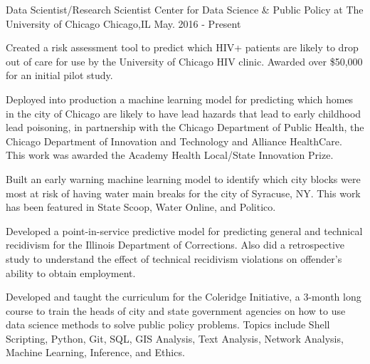 

\begin{cventries}


  \cventry
    {Data Scientist/Research Scientist} %
    {Center for Data Science \& Public Policy at The University of Chicago} %
    {Chicago,IL} %
    {May. 2016 - Present} %
    {\begin{cvitems}
        \setlength\itemsep{.5em}
        \item {Created a risk assessment tool to predict which HIV+ patients are likely to drop out of care for use by the University of Chicago HIV clinic. Awarded over \$50,000 for an initial pilot study.}
        \item {Deployed into production a machine learning model for predicting which homes in the city of Chicago are likely to have lead hazards that lead to early childhood lead poisoning, in partnership with the Chicago Department of Public Health, the Chicago Department of Innovation and Technology and Alliance HealthCare. This work was awarded the Academy Health Local/State Innovation Prize.}
         \item {Built an early warning machine learning model to identify which city blocks were most at risk of having water main breaks for the city of Syracuse, NY. This work has been featured in State Scoop, Water Online, and Politico.}
         \item {Developed a point-in-service predictive model for predicting general and technical recidivism for the Illinois Department of Corrections. Also did a retrospective study to understand the effect of technical recidivism violations on offender's ability to obtain employment.}
         \item{Developed and taught the curriculum for the Coleridge Initiative, a 3-month long course to train the heads of city and state government agencies on how to use data science methods to solve public policy problems. Topics include Shell Scripting, Python, Git, SQL, GIS Analysis, Text Analysis, Network Analysis, Machine Learning, Inference, and Ethics.}
     \end{cvitems}}



\end{cventries}
